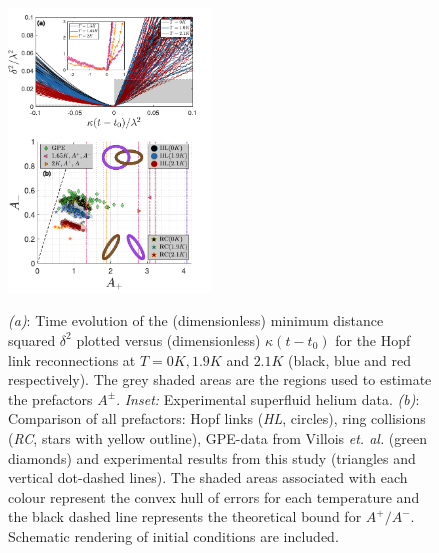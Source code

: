 \documentclass[9pt,twocolumn,twoside]{pnas-new}
\providecommand{\DIFaddbeginFL}{} %
\providecommand{\DIFaddendFL}{} %
\newcommand{\DIFaddincludegraphics}[2][]{{\color{blue}\fbox{\DIFOincludegraphics[#1]{#2}}}} %
\DeclareRobustCommand{\DIFaddbeginFL}{\DIFOaddbeginFL \let\includegraphics\DIFaddincludegraphics} %
\DeclareRobustCommand{\DIFaddendFL}{\DIFOaddendFL \let\includegraphics\DIFOincludegraphics} %
\begin{document}
\begin{figure}[t]
	\centering
	\includegraphics*[width=0.48\textwidth]{minimum_distances_combined.pdf}
\begin{subcaptiongroup*}
	 \label{fig:minimum-distance}
	 \label{fig:prefactors}
\end{subcaptiongroup*}	
\DIFaddendFL \caption{\emph{(a)}: Time evolution of the (dimensionless)
minimum distance squared $\delta^2$ plotted versus (dimensionless) $\kappa (t-t_0)$ for
the Hopf link reconnections at $T=0K,1.9K$ and $2.1K$ (black, blue and red
respectively). The grey shaded areas
are the regions used to estimate the prefactors $A^{\pm}$. 
\emph{Inset:} Experimental superfluid helium data.
\emph{(b)}: Comparison of all prefactors: Hopf links (\emph{HL}, circles), 
ring collisions (\emph{RC}, stars with yellow outline), GPE-data 
from Villois \emph{et. al.} \cite{villoisIrreversibleDynamicsVortex2020} (green diamonds) and experimental results from this study (triangles and vertical dot-dashed lines). 
The shaded areas associated with each colour represent the convex hull of errors 
for each temperature and the black dashed line represents the theoretical bound for $A^+/A^-$. Schematic rendering of initial conditions are included.}
\DIFaddbeginFL \label{fig:min-dist-prefactor}
\DIFaddendFL \end{figure}
\end{document}
